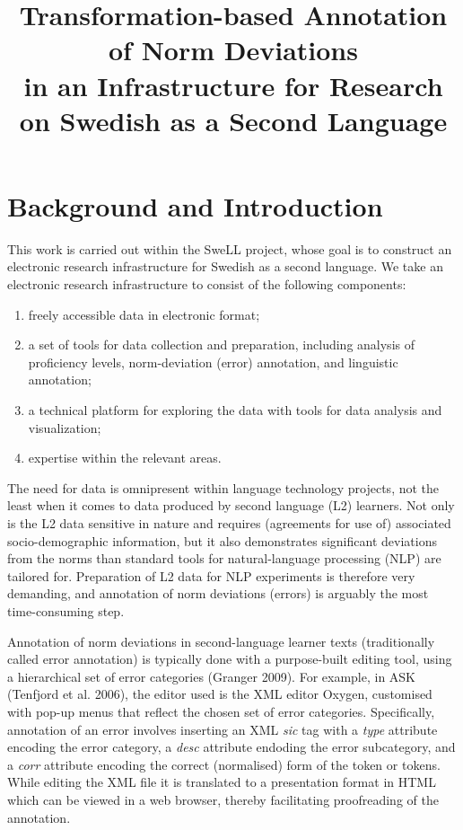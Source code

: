 \documentclass[10pt, a4paper]{article}
\title{Transformation-based Annotation of Norm Deviations \\ in an Infrastructure for Research on Swedish as a Second Language}
\begin{document}
\maketitleabstract

\section{Background and Introduction}

This work is carried out within the SweLL project, whose goal is to construct an electronic research infrastructure for Swedish as a second language. We take an electronic research infrastructure to consist of the following components:
\begin{enumerate}
\item freely accessible data in electronic format;
\item a set of tools for data collection and preparation, including
analysis of proficiency levels, norm-deviation (error) annotation, and linguistic annotation;
\item a technical platform for exploring the data with tools for data analysis and visualization;
\item expertise within the relevant areas.
\end{enumerate}

The need for data is omnipresent within language technology projects, not the least when it comes to data produced by second language (L2) learners. Not only is the L2 data sensitive in nature and requires (agreements for use of) associated socio-demographic information, but it also demonstrates significant deviations from the norms than standard tools for natural-language processing (NLP) are tailored for. Preparation of L2 data for NLP experiments is therefore very demanding, and annotation of norm deviations (errors) is arguably the most time-consuming step.

Annotation of norm deviations in second-language learner texts (traditionally
called error annotation) is typically done with a purpose-built editing tool,
using a hierarchical set of error categories (Granger 2009). For example,
in ASK (Tenfjord et al. 2006), the editor used is the XML editor Oxygen,
customised with pop-up menus that reflect the chosen set of error
categories. Specifically, annotation of an error involves inserting an XML
{\em sic} tag with a {\em type} attribute encoding the error category, a {\em
desc} attribute endoding the error subcategory, and a {\em corr} attribute
encoding the correct (normalised) form of the token or tokens.
While editing the XML file it is translated to a presentation format in HTML
which can be viewed in a web browser, thereby facilitating proofreading of
the annotation.
\end{document}
